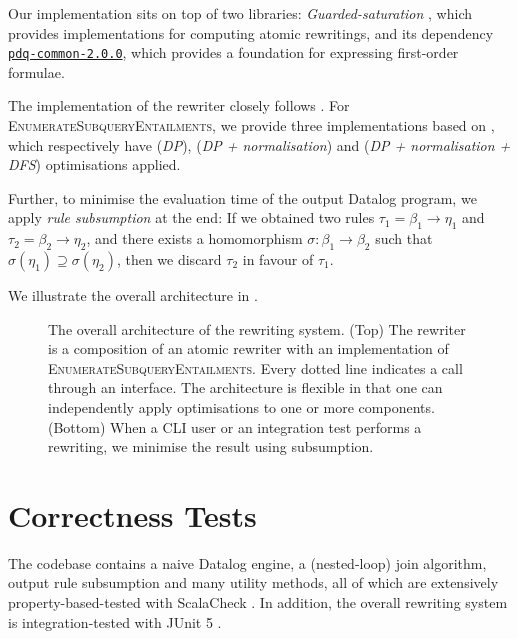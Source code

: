 \documentclass[12pt]{report}
\theoremstyle{plain}
\theoremstyle{definition}
\begin{document}
Our implementation sits on top of two libraries: \emph{Guarded-saturation} \cite{Benedikt_Rewriting_the_Infinite}, which provides implementations for computing atomic rewritings, and its dependency \href{https://github.com/ProofDrivenQuerying/pdq/releases/tag/v2.0.0}{\texttt{pdq-common-2.0.0}}, which provides a foundation for expressing first-order formulae.

The implementation of the rewriter closely follows . For \\ \textsc{EnumerateSubqueryEntailments}, we provide three implementations based on , which respectively have (\emph{DP}), (\emph{DP + normalisation}) and (\emph{DP + normalisation + DFS}) optimisations applied.

Further, to minimise the evaluation time of the output Datalog program, we apply \emph{rule subsumption} at the end: If we obtained two rules $\tau_1 = \beta_1 \rightarrow \eta_1$ and $\tau_2 = \beta_2 \rightarrow \eta_2$, and there exists a homomorphism $\sigma: \beta_1 \rightarrow \beta_2$ such that $\sigma(\eta_1) \supseteq \sigma(\eta_2)$, then we discard $\tau_2$ in favour of $\tau_1$.

We illustrate the overall architecture in .

\begin{figure}[h]
\centering

\caption{The overall architecture of the rewriting system. (Top) The rewriter is a composition of an atomic rewriter with an implementation of \textsc{EnumerateSubqueryEntailments}. Every dotted line indicates a call through an interface. The architecture is flexible in that one can independently apply optimisations to one or more components. (Bottom) When a CLI user or an integration test performs a rewriting, we minimise the result using subsumption.}
\label{figure:implementation-architecture}
\end{figure}

\section{Correctness Tests}
\label{section:correctness-tests}

The codebase contains a naive Datalog engine, a (nested-loop) join algorithm, output rule subsumption and many utility methods, all of which are extensively property-based-tested with ScalaCheck \cite{scalacheck}. In addition, the overall rewriting system is integration-tested with JUnit 5 \cite{junit}.
\end{document}
